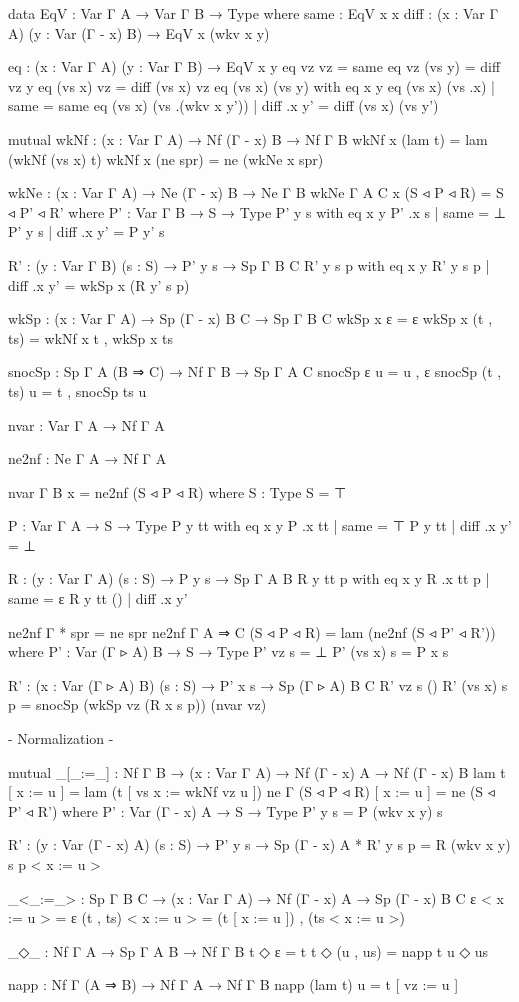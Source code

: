 \begin{code}
data EqV : Var Γ A → Var Γ B → Type where
  same : EqV x x
  diff : (x : Var Γ A) (y : Var (Γ - x) B) → EqV x (wkv x y)

eq : (x : Var Γ A) (y : Var Γ B) → EqV x y
eq vz vz = same
eq vz (vs y) = diff vz y
eq (vs x) vz = diff (vs x) vz
eq (vs x) (vs y) with eq x y
eq (vs x) (vs .x)          | same = same
eq (vs x) (vs .(wkv x y')) | diff .x y' = diff (vs x) (vs y')

mutual
  wkNf : (x : Var Γ A) → Nf (Γ - x) B → Nf Γ B
  wkNf x (lam t) = lam (wkNf (vs x) t)
  wkNf x (ne spr) = ne (wkNe x spr)

  wkNe : (x : Var Γ A) → Ne (Γ - x) B → Ne Γ B
  wkNe {Γ} {A} {C} x (S ◃ P ◃ R) = S ◃ P' ◃ R'
    where
    P' : Var Γ B → S → Type
    P' y  s with eq x y
    P' .x s | same = ⊥
    P' y  s | diff .x y' = P y' s

    R' : (y : Var Γ B) (s : S) → P' y s → Sp Γ B C
    R' y s p with eq x y
    R' y s p | diff .x y' = wkSp x (R y' s p)

  wkSp : (x : Var Γ A) → Sp (Γ - x) B C → Sp Γ B C
  wkSp x ε = ε
  wkSp x (t , ts) = wkNf x t , wkSp x ts

snocSp : Sp Γ A (B ⇒ C) → Nf Γ B → Sp Γ A C
snocSp ε u = u , ε
snocSp (t , ts) u = t , snocSp ts u
\end{code}

\begin{code}
nvar : Var Γ A → Nf Γ A

ne2nf : Ne Γ A → Nf Γ A

nvar {Γ} {B} x = ne2nf (S ◃ P ◃ R)
  where
  S : Type
  S = ⊤

  P : Var Γ A → S → Type
  P y  tt with eq x y
  P .x tt | same = ⊤
  P y  tt | diff .x y' = ⊥

  R : (y : Var Γ A) (s : S) → P y s → Sp Γ A B
  R y tt p with eq x y
  R .x tt p | same = ε
  R y tt () | diff .x y'

ne2nf {Γ} {*} spr = ne spr
ne2nf {Γ} {A ⇒ C} (S ◃ P ◃ R) = lam (ne2nf (S ◃ P' ◃ R'))
  where
  P' : Var (Γ ▹ A) B → S → Type
  P' vz s = ⊥
  P' (vs x) s = P x s

  R' : (x : Var (Γ ▹ A) B) (s : S) → P' x s → Sp (Γ ▹ A) B C
  R' vz s ()
  R' (vs x) s p = snocSp (wkSp vz (R x s p)) (nvar vz)

{- Normalization -}

mutual
  _[_:=_] : Nf Γ B → (x : Var Γ A) → Nf (Γ - x) A → Nf (Γ - x) B
  lam t [ x := u ] = lam (t [ vs x := wkNf vz u ])
  ne {Γ} (S ◃ P ◃ R) [ x := u ] = ne (S ◃ P' ◃ R')
    where
    P' : Var (Γ - x) A → S → Type
    P' y s = P (wkv x y) s

    R' : (y : Var (Γ - x) A) (s : S) → P' y s → Sp (Γ - x) A *
    R' y s p = R (wkv x y) s p < x := u >

  _<_:=_> : Sp Γ B C → (x : Var Γ A) → Nf (Γ - x) A → Sp (Γ - x) B C
  ε < x := u > = ε
  (t , ts) < x := u > = (t [ x := u ]) , (ts < x := u >)

  _◇_ : Nf Γ A → Sp Γ A B → Nf Γ B
  t ◇ ε = t
  t ◇ (u , us) = napp t u ◇ us

  napp : Nf Γ (A ⇒ B) → Nf Γ A → Nf Γ B
  napp (lam t) u = t [ vz := u ]
\end{code}

